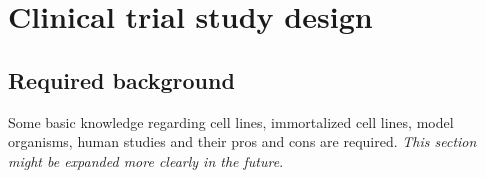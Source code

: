 \chapter{Clinical trial study design}
  
  \section{Required background}
    Some basic knowledge regarding cell lines, immortalized cell lines, model organisms, human studies and their pros and cons are required. \textit{This section might be expanded more clearly in the future}.

